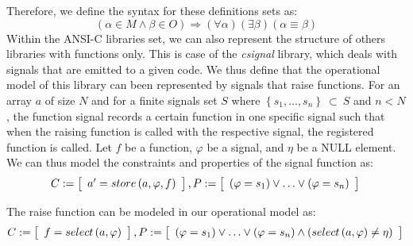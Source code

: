 \documentclass[a4paper]{llncs}
\begin{document}
Therefore, we define the syntax for these definitions sets as:
%
\begin{equation}
\left( \alpha \in M \wedge \beta \in O \right) \Rightarrow \left(\forall\alpha\right)\left(\exists\beta\right)\left(\alpha\equiv\beta\right)
\label{eq:csi646-definitions}
\end{equation}
Within the ANSI-C libraries set, we can also represent the structure
of others libraries with functions only. This is case of the \textit{csignal}
library, which deals with signals that are emitted to a given code.
We thus define that the operational model of this library can been represented
by signals that raise functions. For an array $a$ of size $N$ and
for a finite signals set $S$ where $\left\{s_{1},\ldots, s_{n}\right\}\:\subset\:S$
and $n < N$, the function signal records a certain function in one specific signal
such that when the raising function is called with the respective signal,
the registered function is called. Let $f$ be a function, $\varphi$ be a signal,
and $\eta$ be a NULL element. We can thus model the constraints and properties 
of the signal function as:
%
\begin{equation}
\label{quantifier-free-formulae-sginal}
C := \left [ \begin{array}{ll} 
                a' = store\left(a,\varphi,f\right) \\
              \end{array} \right ],  \\ 
P := \left [ \begin{array}{ll} 
                \left(\varphi = s_{1}\right) \vee \ldots \vee \left(\varphi = s_{n}\right) \\
              \end{array} \right ]  \\               
\end{equation}

The raise function can be modeled in our operational model as:
%
%
\begin{equation}
\label{quantifier-free-formulae-raise}
C := \left [ \begin{array}{ll} 
                f = select\left(a,\varphi\right) \\
              \end{array} \right ],  \\  
P := \left [ \begin{array}{ll} 
                \left(\varphi = s_{1}\right) \vee \ldots \vee \left(\varphi = s_{n}\right) \wedge \left(select\left(a,\varphi\right) \neq \eta\right) \\
              \end{array} \right ]  \\               
\end{equation}
\end{document}

